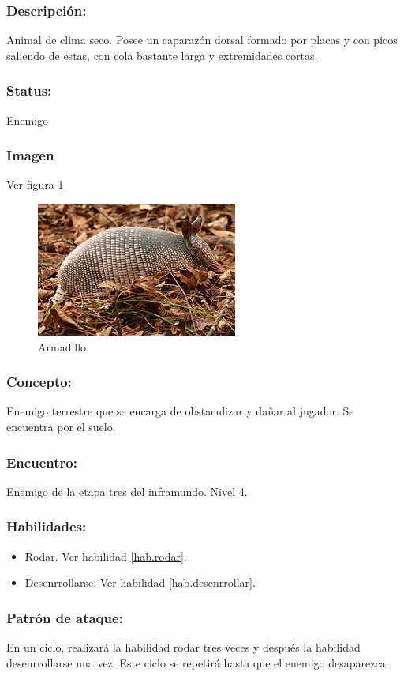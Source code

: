 \documentclass[11pt,letterpaper]{article}
\begin{document}
\subsubsection{Descripción:}
Animal de clima seco. Posee un caparazón dorsal formado por placas y con picos saliendo de estas, con cola bastante larga y extremidades cortas.
\subsubsection{Status:}
Enemigo
\subsubsection{Imagen}
Ver figura \ref{fig:armadillo}
\begin{figure}
	\centering
	\includegraphics[height=0.2 \textheight]{Imagenes/armadillo}
	\caption{Armadillo.}
	\label{fig:armadillo}
\end{figure} 
\subsubsection{Concepto:}
Enemigo terrestre que se encarga de obstaculizar y dañar al jugador. Se encuentra por el suelo.
\subsubsection{Encuentro:}
Enemigo de la etapa tres del inframundo.
Nivel 4.
\subsubsection{Habilidades:}
\begin{itemize}
	\item Rodar. Ver habilidad \ref{hab.rodar}.
	\item Desenrrollarse. Ver habilidad \ref{hab.desenrrollar}.
\end{itemize}
\subsubsection{Patrón de ataque:}
En un ciclo, realizará la habilidad rodar tres veces y después la habilidad desenrrollarse una vez. Este ciclo se repetirá hasta que el enemigo desaparezca.
\end{document}
